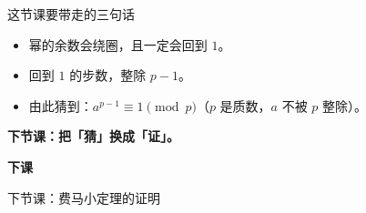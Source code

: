 \documentclass[10pt]{beamer}
\begin{document}
\begin{frame}{这节课要带走的三句话}
  \begin{itemize}
    \item 幂的余数会绕圈，且一定会回到 \(1\)。
    \item 回到 \(1\) 的步数，整除 \(p-1\)。
    \item 由此猜到：\(a^{p-1}\equiv1\pmod p\)（\(p\) 是质数，\(a\) 不被 \(p\) 整除）。
  \end{itemize}
  \pause
  \begin{center}
    {\large\textcolor{textgreen}{\bfseries 下节课：把「猜」换成「证」。}}
  \end{center}
\end{frame}

\begin{frame}
  \begin{center}
    \vspace{1.6cm}
    {\Large\textcolor{textgreen}{\bfseries 下课}}

    \vspace{1.0cm}
    {\large\textcolor{accentgreen}{下节课：费马小定理的证明}}
  \end{center}
\end{frame}
\end{document}
